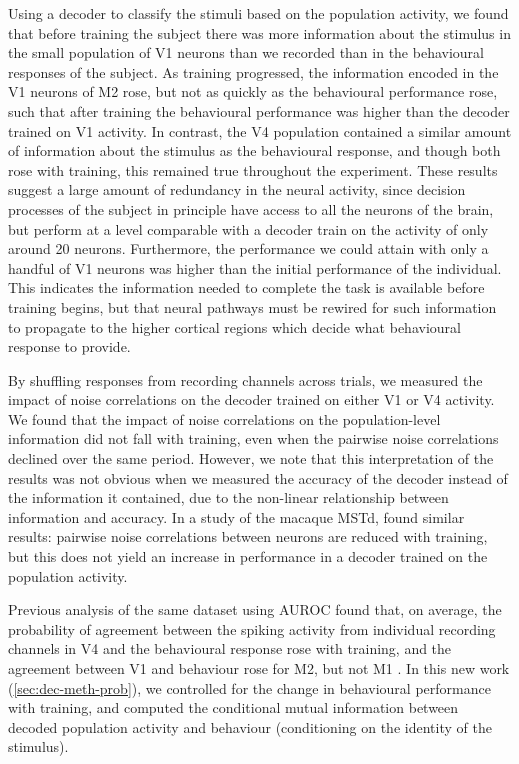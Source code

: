 Using a decoder to classify the stimuli based on the population activity, we found that before training the subject there was more information about the stimulus in the small population of \ac{V1} neurons than we recorded than in the behavioural responses of the subject.
As training progressed, the information encoded in the \ac{V1} neurons of \ac{M2} rose, but not as quickly as the behavioural performance rose, such that after training the behavioural performance was higher than the decoder trained on \ac{V1} activity.
In contrast, the \ac{V4} population contained a similar amount of information about the stimulus as the behavioural response, and though both rose with training, this remained true throughout the experiment.
These results suggest a large amount of redundancy in the neural activity, since decision processes of the subject in principle have access to all the neurons of the brain, but perform at a level comparable with a decoder train on the activity of only around \num{20} neurons.
Furthermore, the performance we could attain with only a handful of \ac{V1} neurons was higher than the initial performance of the individual.
This indicates the information needed to complete the task is available before training begins, but that neural pathways  must be rewired for such information to propagate to the higher cortical regions which decide what behavioural response to provide.

By shuffling responses from recording channels across trials, we measured the impact of noise correlations on the decoder trained on either \ac{V1} or \ac{V4} activity.
We found that the impact of noise correlations on the population-level information did not fall with training, even when the pairwise noise correlations declined over the same period.
However, we note that this interpretation of the results was not obvious when we measured the accuracy of the decoder instead of the information it contained, due to the non-linear relationship between information and accuracy.
In a study of the macaque \ac{MSTd}, \citet{Gu2011} found similar results: pairwise noise correlations between neurons are reduced with training, but this does not yield an increase in performance in a decoder trained on the population activity.



Previous analysis of the same dataset using \ac{AUROC} found that, on average, the probability of agreement between the spiking activity from individual recording channels in \ac{V4} and the behavioural response rose with training, and the agreement between \ac{V1} and behaviour rose for \ac{M2}, but not \ac{M1} \citep{Chen2013thesis}.
In this new work (\autoref{sec:dec-meth-prob}), we controlled for the change in behavioural performance with training, and computed the conditional mutual information between decoded population activity and behaviour (conditioning on the identity of the stimulus).

